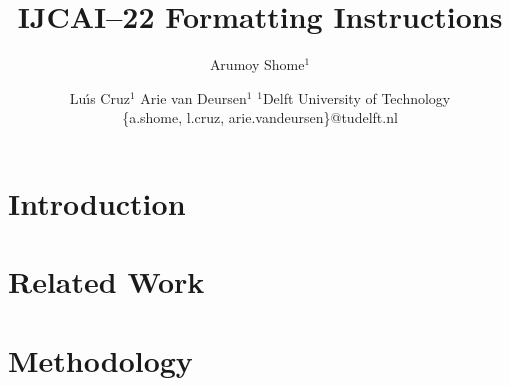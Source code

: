 \documentclass{article}
\title{IJCAI--22 Formatting Instructions}
\author{
Arumoy Shome$^1$
\and
Lu{\'\i}s Cruz$^1$\And
Arie van Deursen$^{1}$
\affiliations
$^1$Delft University of Technology\\
\emails
\{a.shome, l.cruz, arie.vandeursen\}@tudelft.nl
}
\begin{document}
\maketitle

\begin{abstract}
\end{abstract}

\appendix

\section{Introduction}\label{sec:intro}




\section{Related Work}\label{sec:related}


\section{Methodology}\label{sec:method}
\end{document}
